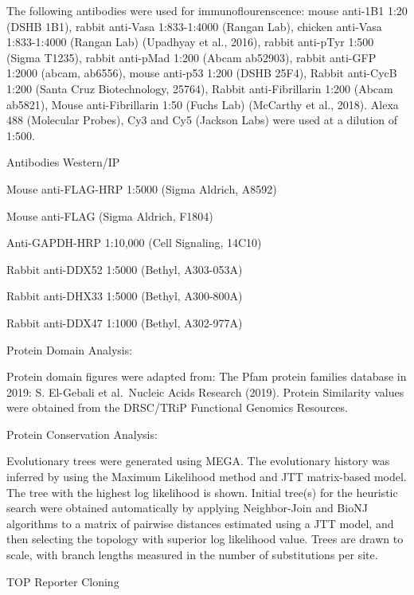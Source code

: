 \documentclass[12pt,twoside]{reedthesis}
\begin{document}
The following antibodies were used for immunoflourenscence: mouse
anti-1B1 1:20 (DSHB 1B1), rabbit anti-Vasa 1:833-1:4000 (Rangan Lab),
chicken anti-Vasa 1:833-1:4000 (Rangan Lab)
(Upadhyay et al., 2016), rabbit anti-pTyr
1:500 (Sigma T1235), rabbit anti-pMad 1:200 (Abcam ab52903), rabbit
anti-GFP 1:2000 (abcam, ab6556), mouse anti-p53 1:200 (DSHB 25F4),
Rabbit anti-CycB 1:200 (Santa Cruz Biotechnology, 25764), Rabbit
anti-Fibrillarin 1:200 (Abcam ab5821), Mouse anti-Fibrillarin 1:50
(Fuchs Lab) (McCarthy et al., 2018). Alexa 488 (Molecular Probes), Cy3 and
Cy5 (Jackson Labs) were used at a dilution of 1:500.

{Antibodies Western/IP}

Mouse anti-FLAG-HRP 1:5000 (Sigma Aldrich, A8592)

Mouse anti-FLAG (Sigma Aldrich, F1804)

Anti-GAPDH-HRP 1:10,000 (Cell Signaling, 14C10)

Rabbit anti-DDX52 1:5000 (Bethyl, A303-053A)

Rabbit anti-DHX33 1:5000 (Bethyl, A300-800A)

Rabbit anti-DDX47 1:1000 (Bethyl, A302-977A)

{Protein Domain Analysis}:

Protein domain figures were adapted from: The Pfam protein families
database in 2019: S. El-Gebali et al.~Nucleic Acids Research (2019).
Protein Similarity values were obtained from the DRSC/TRiP Functional
Genomics Resources.

{Protein Conservation Analysis}:

Evolutionary trees were generated using MEGA. The evolutionary history
was inferred by using the Maximum Likelihood method and JTT matrix-based
model. The tree with the highest log likelihood is shown. Initial
tree(s) for the heuristic search were obtained automatically by applying
Neighbor-Join and BioNJ algorithms to a matrix of pairwise distances
estimated using a JTT model, and then selecting the topology with
superior log likelihood value. Trees are drawn to scale, with branch
lengths measured in the number of substitutions per site.

{TOP Reporter Cloning}
\end{document}
